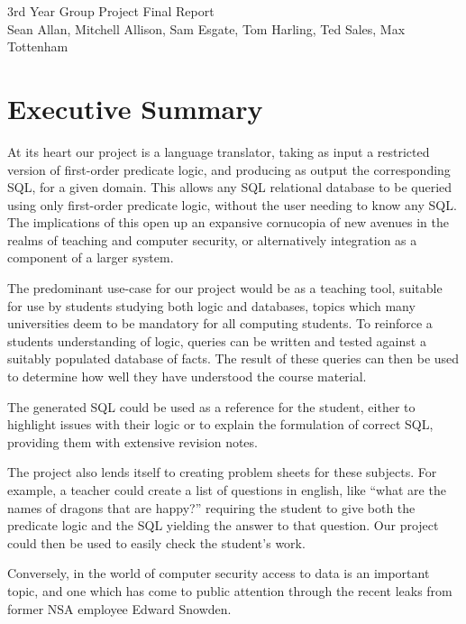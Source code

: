 \documentclass[a4paper, 11pt]{article}
\begin{document}
\begin{center}
  \huge 3rd Year Group Project Final Report \\ [0.4cm]
  \large Sean Allan, Mitchell Allison, Sam Esgate, Tom Harling, Ted Sales,
         Max Tottenham \\ [0.2cm]
  \vspace{0cm}
\end{center}

\tableofcontents
\clearpage

\section{Executive Summary}
  At its heart our project is a language translator, taking as input a
  restricted version of first-order predicate logic, and producing as output
  the corresponding SQL, for a given domain. This allows any SQL relational
  database to be queried using only first-order predicate logic, without the
  user needing to know any SQL. The implications of this open up an expansive
  cornucopia of new avenues in the realms of teaching and computer security, or
  alternatively integration as a component of a larger system.

  The predominant use-case for our project would be as a teaching tool,
  suitable for use by students studying both logic and databases, topics which
  many universities deem to be mandatory for all computing students. To
  reinforce a students understanding of logic, queries can be written and tested
  against a suitably populated database of facts. The result of these queries
  can then be used to determine how well they have understood the course
  material.

  The generated SQL could be used as a reference for the student, either to
  highlight issues with their logic or to explain the formulation of correct
  SQL, providing them with extensive revision notes.

  The project also lends itself to creating problem sheets for these subjects.
  For example, a teacher could create a list of questions in english, like
  ``what are the names of dragons that are happy?'' requiring the student to
  give both the predicate logic and the SQL yielding the answer to that
  question. Our project could then be used to easily check the student's work.


  Conversely, in the world of computer security access to data is an important
  topic, and one which has come to public attention through the recent leaks
  from former NSA employee Edward Snowden.
\end{document}
